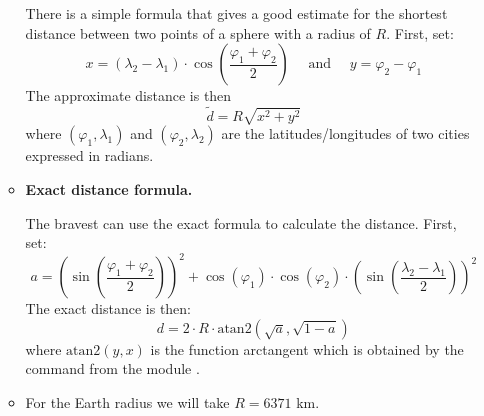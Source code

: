 \documentclass[11pt,class=report,crop=false]{standalone}
\begin{document}
\begin{activite}
\begin{enumerate}
\begin{itemize}
	There is a simple formula that gives a good estimate for the shortest distance between two points of a sphere with a radius of $R$.
    First, set:
    $$x =   (\lambda_2-\lambda_1)\cdot  \cos\left( \frac{\varphi_1+\varphi_2}{2} \right)
    \quad\text{ and }\quad 
    y = \varphi_2-\varphi_1$$
	The approximate distance is then 
	$$ \tilde d = R \sqrt{x^2 + y^2}$$		
	where $(\varphi_1,\lambda_1)$ and $(\varphi_2,\lambda_2)$ are the latitudes/longitudes of two cities expressed in radians.
	
	\item \textbf{Exact distance formula.}
	
	The bravest can use the exact formula to calculate the distance.
	First, set: 
	$$a = \left(\sin\left(\frac{\varphi_1+\varphi_2}{2}\right)\right)^2 + \cos(\varphi_1)\cdot \cos(\varphi_2) \cdot \left(\sin\left( \frac{\lambda_2-\lambda_1}{2} \right)\right)^2$$
    The exact distance is then:
    $$d = 2 \cdot R \cdot \text{atan2}\left(\sqrt{a},\sqrt{1-a}\right)$$
    where $\text{atan2}(y,x)$ is the function \og{}arctangent\fg{} which is obtained by the command  from the module .	
	
	\item For the Earth radius we will take $R = 6371$ km.

\end{itemize}
  
\end{enumerate}   
     
\end{activite}
\end{document}
